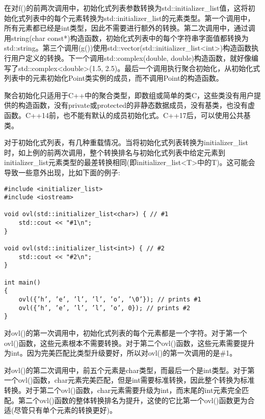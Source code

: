 在对f()的前两次调用中，初始化式列表参数转换为std::initializer\_list值，这将初始化式列表中的每个元素转换为std::initializer\_list的元素类型。第一个调用中，所有元素都已经是int类型，因此不需要进行额外的转换。第二次调用中，通过调用string(char const*)构造函数，初始化式列表中的每个字符串字面值都转换为std::string。第三个调用(g())使用std::vector(std::initializer\_list<int>)构造函数执行用户定义的转换。下一个调用std::complex(double, double)构造函数，就好像编写了std::complex<double>(1.5, 2.5)。最后一个调用执行聚合初始化，从初始化式列表中的元素初始化Point类实例的成员，而不调用Point的构造函数。

\begin{tcolorbox}[colback=webgreen!5!white,colframe=webgreen!75!black]
\hspace*{0.75cm}聚合初始化只适用于C++中的聚合类型，即数组或简单的类C，这些类没有用户提供的构造函数，没有private或protected的非静态数据成员，没有基类，也没有虚函数。C++14前，也不能有默认的成员初始化式。C++17后，可以使用公共基类。
\end{tcolorbox}

对于初始化式列表，有几种重载情况。当将初始化式列表转换为initializer\_list时，如上例的前两次调用，整个转换排名与初始化式列表中给定元素到initializer\_list元素类型的最差转换相同(即initializer\_list<T>中的T)。这可能会导致一些意外出现，比如下面的例子:

\begin{lstlisting}[style=styleCXX]
#include <initializer_list>
#include <iostream>

void ovl(std::initializer_list<char>) { // #1
	std::cout << "#1\n";
}

void ovl(std::initializer_list<int>) { // #2
	std::cout << "#2\n";
}

int main()
{
	ovl({’h’, ’e’, ’l’, ’l’, ’o’, ’\0’}); // prints #1
	ovl({’h’, ’e’, ’l’, ’l’, ’o’, 0}); // prints #2
}
\end{lstlisting}

对ovl()的第一次调用中，初始化式列表的每个元素都是一个字符。对于第一个ovl()函数，这些元素根本不需要转换。对于第二个ovl()函数，这些元素需要提升为int。因为完美匹配比类型升级要好，所以对ovl()的第一次调用的是\#1。

对ovl()的第二次调用中，前五个元素是char类型，而最后一个是int类型。对于第一个ovl()函数，char元素完美匹配，但是int需要标准转换，因此整个转换为标准转换。对于第二个ovl()函数，char元素需要升级为int，而末尾的int元素完全匹配。第二个ovl()函数的整体转换排名为提升，这使的它比第一个ovl()函数更为合适(尽管只有单个元素的转换更好)。

